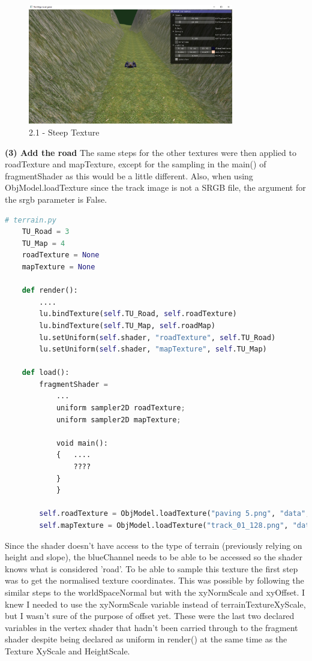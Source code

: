 \documentclass[a4 paper, 12pt]{article}
\begin{document}
    \begin{figure} [H]
        \centering
        \includegraphics[width=0.8\textwidth, frame]
            {./images/mega_racer/2.1_b.PNG}
        \caption{2.1 - Steep Texture}   
    \end{figure}




\textbf{(3) Add the road}
The same steps for the other textures were then applied to roadTexture and mapTexture, except for the sampling in the main() of fragmentShader as this would be a little different. Also, when using ObjModel.loadTexture since the track image is not a SRGB file, the argument for the srgb parameter is False. 
\begin{lstlisting}[language=python]
    # terrain.py
    TU_Road = 3
    TU_Map = 4
    roadTexture = None
    mapTexture = None

    def render():
        ....
        lu.bindTexture(self.TU_Road, self.roadTexture)
        lu.bindTexture(self.TU_Map, self.roadMap)
        lu.setUniform(self.shader, "roadTexture", self.TU_Road)
        lu.setUniform(self.shader, "mapTexture", self.TU_Map)

    def load():
        fragmentShader = 
            ...
            uniform sampler2D roadTexture;
            uniform sampler2D mapTexture;

            void main():
            {   ....
                ????
            }
            }
        
        self.roadTexture = ObjModel.loadTexture("paving 5.png", "data", True)
        self.mapTexture = ObjModel.loadTexture("track_01_128.png", "data", False)
\end{lstlisting}


Since the shader doesn't have access to the type of terrain (previously relying on height and slope), the blueChannel needs to be able to be accessed so the shader knows what is considered 'road'. To be able to sample this texture the first step was to get the normalised texture coordinates. This was possible by following the similar steps to the worldSpaceNormal but with the xyNormScale and xyOffset. I knew I needed to use the xyNormScale variable instead of terrainTextureXyScale, but I wasn't sure of the purpose of offset yet. These were the last two declared variables in the vertex shader that hadn't been carried through to the fragment shader despite being declared as uniform in render() at the same time as the Texture XyScale and HeightScale.
\end{document}
